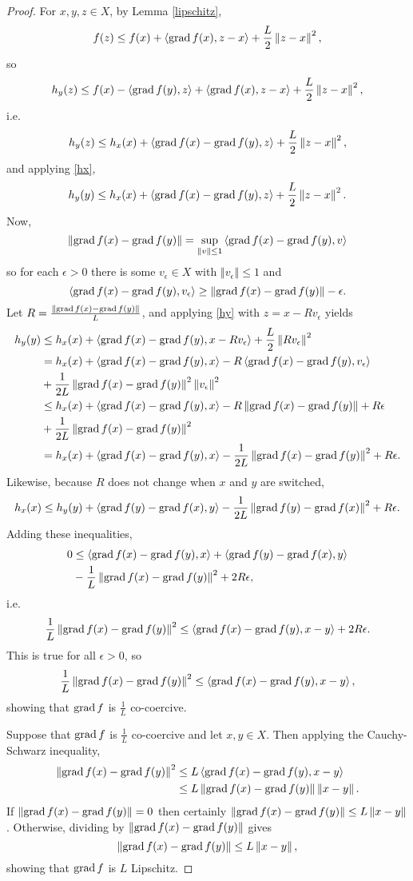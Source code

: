 \documentclass{article}
\newcommand{\inner}[2]{\left\langle #1, #2 \right\rangle}
\newcommand{\grad}{\ensuremath\mathrm{grad}\,}
\newcommand{\norm}[1]{\left\Vert #1 \right\Vert}
\theoremstyle{definition}
\begin{document}
\begin{proof}
For $x,y,z \in X$,
by Lemma \ref{lipschitz},
\[
f(z) \leq f(x)+\inner{\grad f(x)}{z-x} + \frac{L}{2} \norm{z-x}^2,
\]
so
\[
h_y(z) \leq f(x)-\inner{\grad f(y)}{z} +\inner{\grad f(x)}{z-x} + \frac{L}{2} \norm{z-x}^2,
\]
i.e.
\[
h_y(z) \leq h_x(x)+\inner{\grad f(x)-\grad f(y)}{z}+\frac{L}{2}\norm{z-x}^2,
\]
and applying \eqref{hx},
\begin{equation}
h_y(y) \leq h_x(x) +\inner{\grad f(x)-\grad f(y)}{z}+\frac{L}{2}\norm{z-x}^2.
\label{hy}
\end{equation}
Now,
\[
\norm{\grad f(x)-\grad f(y)} = \sup_{\norm{v} \leq 1} \inner{\grad f(x)-\grad f(y)}{v}
\]
so for each $\epsilon>0$ there is some $v_\epsilon \in X$ with $\norm{v_\epsilon} \leq 1$ and
\[
 \inner{\grad f(x)-\grad f(y)}{v_\epsilon} \geq 
\norm{\grad f(x)-\grad f(y)} -\epsilon.
\]
Let $R=\frac{\norm{\grad f(x)-\grad f(y)}}{L}$, and applying \eqref{hy} with  $z=x-Rv_\epsilon$  yields
\begin{align*}
h_y(y) &\leq h_x(x) + \inner{\grad f(x)-\grad f(y)}{x-Rv_\epsilon} +\frac{L}{2}\norm{Rv_\epsilon}^2\\
&=h_x(x)+\inner{\grad f(x)-\grad f(y)}{x} - R \inner{\grad f(x)-\grad f(y)}{v_\epsilon}\\
&+\frac{1}{2L} \norm{\grad f(x)-\grad f(y)}^2 \norm{v_\epsilon}^2\\
&\leq h_x(x)+\inner{\grad f(x)-\grad f(y)}{x} -R\norm{\grad f(x)-\grad f(y)} + R\epsilon\\
&+\frac{1}{2L} \norm{\grad f(x)-\grad f(y)}^2\\
&=h_x(x)+\inner{\grad f(x)-\grad f(y)}{x}  - \frac{1}{2L} \norm{\grad f(x)-\grad f(y)}^2 + R\epsilon.
\end{align*}
Likewise, because $R$ does not change when $x$ and $y$ are switched,
\[
h_x(x) \leq h_y(y)+\inner{\grad f(y)-\grad f(x)}{y}  - \frac{1}{2L} \norm{\grad f(y)-\grad f(x)}^2 + R\epsilon.
\]
Adding these inequalities,
\begin{align*}
0 &\leq \inner{\grad f(x)-\grad f(y)}{x} + \inner{\grad f(y)-\grad f(x)}{y} \\
&- \frac{1}{L} \norm{\grad f(x)-\grad f(y)}^2+2R\epsilon,
\end{align*}
i.e.
\[
\frac{1}{L} \norm{\grad f(x)-\grad f(y)}^2 \leq  \inner{\grad f(x)-\grad f(y)}{x-y} +2R\epsilon.
\]
This is true for all $\epsilon>0$, so
\[
\frac{1}{L} \norm{\grad f(x)-\grad f(y)}^2 \leq  \inner{\grad f(x)-\grad f(y)}{x-y},
\]
showing that $\grad f$ is $\frac{1}{L}$ co-coercive.

Suppose that $\grad f$ is $\frac{1}{L}$ co-coercive and let $x,y \in X$. Then applying the Cauchy-Schwarz inequality,
\begin{align*}
\norm{\grad f(x)-\grad f(y)}^2 &\leq L \inner{\grad f(x)-\grad f(y)}{x-y}\\
&\leq L \norm{\grad f(x)-\grad f(y)} \norm{x-y}.
\end{align*}
If $\norm{\grad f(x)-\grad f(y)}=0$ then certainly $\norm{\grad f(x)-\grad f(y)} \leq L \norm{x-y}$. Otherwise, dividing by
$\norm{\grad f(x)-\grad f(y)}$ gives
\[
\norm{\grad f(x)-\grad f(y)} \leq L \norm{x-y},
\]
showing that $\grad f$ is $L$ Lipschitz.
\end{proof}
\end{document}
